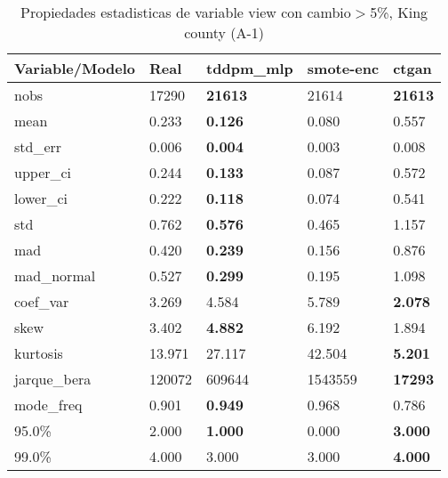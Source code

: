 \begin{table}[H]
\centering
\fontsize{8}{14}\selectfont
\caption{Propiedades estadisticas de variable view con cambio\ensuremath{>}5\%, King county (A-1)}
\label{table-stats-king county-a-1-view-short}
\begin{tabular}{|l|m{10em}|m{10em}|m{10em}|m{10em}|}
\hline
 \rowcolor[gray]{0.8}
Variable/Modelo & Real & tddpm\_mlp & smote-enc & ctgan \\
\hline nobs & 17290 & \bfseries 21613 & \cellcolor[rgb]{0.9, 0.54, 0.52} 21614 & \bfseries 21613 \\
\hline mean & 0.233 & \bfseries 0.126 & 0.080 & \cellcolor[rgb]{0.9, 0.54, 0.52} 0.557 \\
\hline std\_err & 0.006 & \bfseries 0.004 & \cellcolor[rgb]{0.9, 0.54, 0.52} 0.003 & 0.008 \\
\hline upper\_ci & 0.244 & \bfseries 0.133 & 0.087 & \cellcolor[rgb]{0.9, 0.54, 0.52} 0.572 \\
\hline lower\_ci & 0.222 & \bfseries 0.118 & 0.074 & \cellcolor[rgb]{0.9, 0.54, 0.52} 0.541 \\
\hline std & 0.762 & \bfseries 0.576 & 0.465 & \cellcolor[rgb]{0.9, 0.54, 0.52} 1.157 \\
\hline mad & 0.420 & \bfseries 0.239 & 0.156 & \cellcolor[rgb]{0.9, 0.54, 0.52} 0.876 \\
\hline mad\_normal & 0.527 & \bfseries 0.299 & 0.195 & \cellcolor[rgb]{0.9, 0.54, 0.52} 1.098 \\
\hline coef\_var & 3.269 & 4.584 & \cellcolor[rgb]{0.9, 0.54, 0.52} 5.789 & \bfseries 2.078 \\
\hline skew & 3.402 & \bfseries 4.882 & \cellcolor[rgb]{0.9, 0.54, 0.52} 6.192 & 1.894 \\
\hline kurtosis & 13.971 & 27.117 & \cellcolor[rgb]{0.9, 0.54, 0.52} 42.504 & \bfseries 5.201 \\
\hline jarque\_bera & 120072 & 609644 & \cellcolor[rgb]{0.9, 0.54, 0.52} 1543559 & \bfseries 17293 \\
\hline mode\_freq & 0.901 & \bfseries 0.949 & 0.968 & \cellcolor[rgb]{0.9, 0.54, 0.52} 0.786 \\
\hline 95.0\% & 2.000 & \bfseries 1.000 & \cellcolor[rgb]{0.9, 0.54, 0.52} 0.000 & \bfseries 3.000 \\
\hline 99.0\% & 4.000 & \cellcolor[rgb]{0.9, 0.54, 0.52} 3.000 & \cellcolor[rgb]{0.9, 0.54, 0.52} 3.000 & \bfseries 4.000 \\
\hline
\end{tabular}
\end{table}
